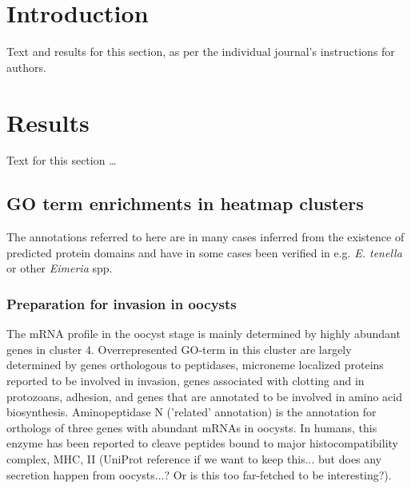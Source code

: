 \documentclass{bmcart}
\begin{document}



\section*{Introduction}
Text and results for this section, as per the individual journal's instructions for authors. 


  \section*{Results}
Text for this section \ldots
\subsection*{GO term enrichments in heatmap clusters}
The annotations referred to here are in many 
cases inferred from the existence of predicted protein domains and have in some cases been 
verified in e.g. \textit{E. tenella} or other \textit{Eimeria} spp. 

\subsubsection*{Preparation for invasion in oocysts}
The mRNA profile in the oocyst stage is mainly determined by highly abundant genes in cluster 4.
Overrepresented GO-term in this cluster are largely determined by genes orthologous to 
peptidases, microneme localized proteins reported to be involved in invasion, 
genes associated with clotting and in protozoans, adhesion, and genes that are annotated 
to be involved in amino acid biosynthesis.
  Aminopeptidase N ('related' annotation) is the annotation for orthologs of three genes with 
abundant mRNAs in oocysts. In humans, this enzyme has been reported to cleave peptides bound to 
major histocompatibility complex, MHC, II (UniProt reference if we want to keep this... but does any
secretion happen from oocysts...? Or is this too far-fetched to be interesting?).
\end{document}
